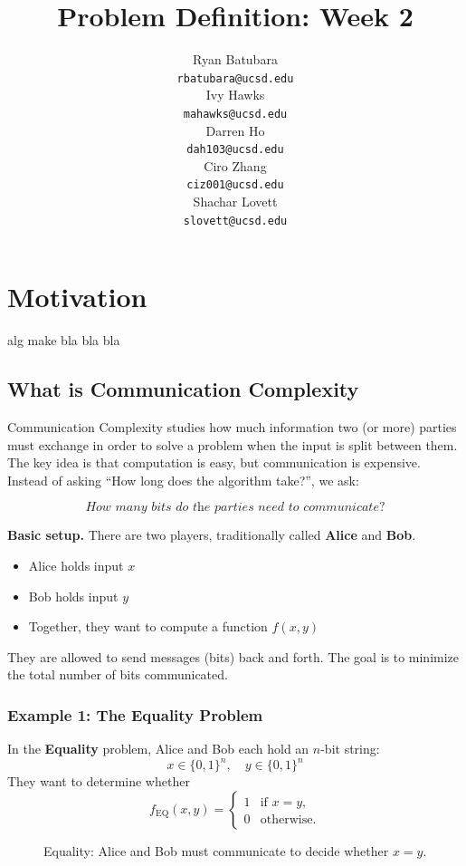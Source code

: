 \documentclass{article}
\title{Problem Definition: Week 2}
\author{
    Ryan Batubara \\ 
    {\tt \small{rbatubara@ucsd.edu}} \\\And
    Ivy Hawks \\
    {\tt \small{mahawks@ucsd.edu}} \\\And
    Darren Ho \\
    {\tt \small{dah103@ucsd.edu}} \\\And
    Ciro Zhang \\
    {\tt \small{ciz001@ucsd.edu}} \\\And
    Shachar Lovett \\
    {\tt \small{slovett@ucsd.edu}} \\}
\begin{document}
\section*{Motivation}

alg make bla bla bla


\subsection*{What is Communication Complexity}

Communication Complexity studies how much information two (or more) parties must exchange in order to solve a problem when the input is split between them. The key idea is that computation is easy, but communication is expensive. Instead of asking ``How long does the algorithm take?'', we ask:  

\[
\textit{How many bits do the parties need to communicate?}
\]



\textbf{Basic setup.}  
There are two players, traditionally called \textbf{Alice} and \textbf{Bob}.  
\begin{itemize}
    \item Alice holds input $x$
    \item Bob holds input $y$
    \item Together, they want to compute a function $f(x,y)$
\end{itemize}
They are allowed to send messages (bits) back and forth. The goal is to minimize the total number of bits communicated.


\bigskip
\newpage
\subsubsection*{Example 1: The Equality Problem}

In the \textbf{Equality} problem, Alice and Bob each hold an $n$-bit string:
\[
x \in \{0,1\}^n, \quad y \in \{0,1\}^n
\]
They want to determine whether
\[
f_{\text{EQ}}(x,y) =
\begin{cases}
1 & \text{if } x = y,\\
0 & \text{otherwise}.
\end{cases}
\]

\begin{figure}[h]
\centering
{}
\caption{Equality: Alice and Bob must communicate to decide whether $x=y$.}
\end{figure}
\end{document}
